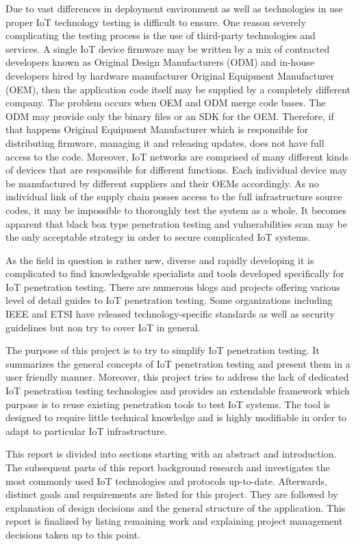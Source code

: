 Due to vast differences in deployment environment as well as technologies in use proper IoT technology testing is difficult to ensure. One reason severely complicating the testing process is the use of third-party technologies and services. A single IoT device firmware may be written by a mix of contracted developers known as Original Design Manufacturers (ODM) and in-house developers hired by hardware manufacturer Original Equipment Manufacturer (OEM), then the application code itself may be supplied by a completely different company\cite{cookbook}. The problem occurs when OEM and ODM merge code bases. The ODM may provide only the binary files or an SDK for the OEM. Therefore, if that happens Original Equipment Manufacturer which is responsible for distributing firmware, managing it and releasing updates, does not have full access to the code. Moreover, IoT networks are comprised of many different kinds of devices that are responsible for different functions. Each individual device may be manufactured by different suppliers and their OEMs accordingly. As no individual link of the supply chain posses access to the full infrastructure source codes, it may be impossible to thoroughly test the system as a whole. It becomes apparent that black box type penetration testing and vulnerabilities scan may be the only acceptable strategy in order to secure complicated IoT systems.

As the field in question is rather new, diverse and rapidly developing it is complicated to find knowledgeable specialists and tools developed specifically for IoT penetration testing. There are numerous blogs and projects offering various level of detail guides to IoT penetration testing\cite{github}. Some organizations including IEEE and ETSI have released technology-specific standards as well as security guidelines but non try to cover IoT in general\cite{Zhao:2013:SIT:2584913.2585964}. 

The purpose of this project is to try to simplify IoT penetration testing. It summarizes the general concepts of IoT penetration testing and present them in a user friendly manner. Moreover, this project tries to address the lack of dedicated IoT penetration testing technologies and provides an extendable framework which purpose is to reuse existing penetration tools to test IoT systems. The tool is designed to require little technical knowledge and is highly modifiable in order to adapt to particular IoT infrastructure.

This report is divided into sections starting with an abstract and introduction. The subsequent parts of this report background research and investigates the most commonly used IoT technologies and protocols up-to-date. Afterwards, distinct goals and requirements are listed for this project. They are followed by explanation of design decisions and the general structure of the application. This report is finalized by listing remaining work and explaining project management decisions taken up to this point.

